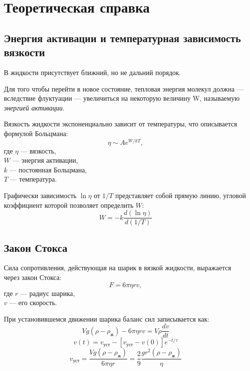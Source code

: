 \documentclass[a4paper,12pt]{article} %
\begin{document}
\section*{Теоретическая справка}

\medskip 

\subsection*{Энергия активации и температурная зависимость вязкости}
В жидкости присутствует ближний, но не дальний порядок.

Для того чтобы перейти в новое состояние, тепловая энергия молекул должна — вследствие флуктуации — увеличиться на некоторую величину W, называемую \textit{энергией активации}.

\medskip

Вязкость жидкости экспоненциально зависит от температуры, что описывается формулой Больцмана:
\begin{equation}
    \eta \sim A e^{W/kT},
\end{equation}
где $\eta$ — вязкость, \\
$W$ — энергия активации, \\
$k$ — постоянная Больцмана, \\
$T$ — температура.

Графически зависимость $\ln \eta$ от $1/T$ представляет собой прямую линию, угловой коэффициент которой позволяет определить $W$:
\begin{equation}
    W = -k \frac{d(\ln \eta)}{d(1/T)}
		\label{W}
\end{equation}

\subsection*{Закон Стокса}
Сила сопротивления, действующая на шарик в вязкой жидкости, выражается через закон Стокса:
\begin{equation}
    F = 6\pi \eta r v,
\end{equation}
где $r$ — радиус шарика, \\
$v$ — его скорость.

При установившемся движении шарика баланс сил записывается как:
\begin{equation}
    V g(\rho - \rho_\text{ж}) - 6 \pi \eta r v = V \rho \frac{d v}{d t}
\end{equation}
\begin{equation}
	v(t) = v_\text{уст} - [v_\text{уст} - v(0)]e^{-t/\tau}
\end{equation}
\begin{equation}
	v_{уст} = \frac{Vg (\rho - \rho_\text{ж})}{6 \pi \eta r} = \frac{2}{9} \frac{g r^2 (\rho - \rho_\text{ж})}{\eta}
\end{equation}
\end{document}
